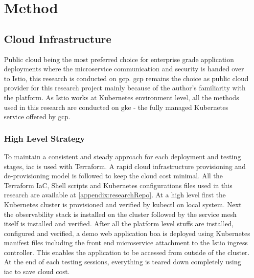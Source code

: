 \section{Method}

\subsection{Cloud Infrastructure}
Public cloud being the most preferred choice for enterprise grade application deployments where the microservice communication and security is handed over to Istio, this research is conducted on \acrlong{gcp}. \acrshort{gcp} remains the choice as public cloud provider for this research project mainly because of the author's familiarity with the platform. As Istio works at Kubernetes environment level, all the methods used in this research are conducted on \acrlong{gke} - the fully managed Kubernetes service offered by \acrshort{gcp}.

\subsubsection{High Level Strategy}
To maintain a consistent and steady approach for each deployment and testing stages, \acrfull{iac} is used with Terraform. A rapid cloud infrastructure provisioning and de-provisioning model is followed to keep the cloud cost minimal. All the Terraform IaC, Shell scripts and Kubernetes configurations files used in this research are available at \ref{appendix:researchRepo}. At a high level first the Kubernetes cluster is provisioned and verified by kubectl on local system. Next the observability stack is installed on the cluster followed by the service mesh itself is installed and verified. After all the platform level stuffs are installed, configured and verified, a demo web application \acrfull{boa} is deployed using Kubernetes manifest files including the front end microservice attachment to the Istio ingress controller. This enables the application to be accessed from outside of the cluster. At the end of each testing sessions, everything is teared down completely using \acrshort{iac} to save cloud cost.

